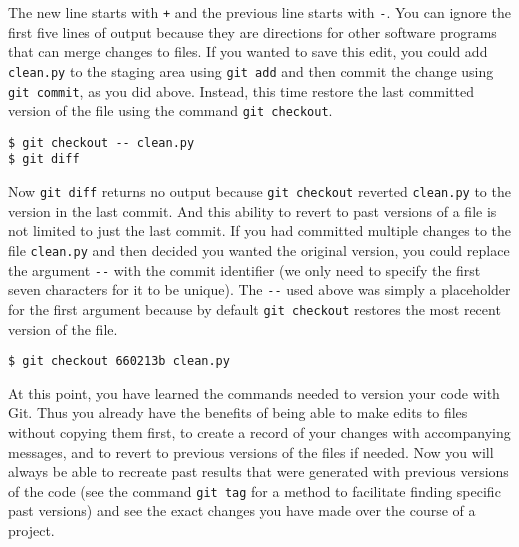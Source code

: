 The new line starts with \verb|+| and the previous line starts with \verb|-|.
You can ignore the first five lines of output because they are directions for other software programs that can merge changes to files.
If you wanted to save this edit, you could add \verb|clean.py| to the staging area using \verb|git add| and then commit the change using \verb|git commit|, as you did above.
Instead, this time restore the last committed version of the file using the command \verb|git checkout|.

\begin{verbatim}
$ git checkout -- clean.py
$ git diff
\end{verbatim}

Now \verb|git diff| returns no output because \verb|git checkout| reverted \verb|clean.py| to the version in the last commit.
And this ability to revert to past versions of a file is not limited to just the last commit.
If you had committed multiple changes to the file \verb|clean.py| and then decided you wanted the original version, you could replace the argument \verb|--| with the commit identifier (we only need to specify the first seven characters for it to be unique).
The \verb|--| used above was simply a placeholder for the first argument because by default \verb|git checkout| restores the most recent version of the file.

\begin{verbatim}
$ git checkout 660213b clean.py
\end{verbatim}


At this point, you have learned the commands needed to version your code with Git.
Thus you already have the benefits of being able to make edits to files without copying them first, to create a record of your changes with accompanying messages, and to revert to previous versions of the files if needed.
Now you will always be able to recreate past results that were generated with previous versions of the code (see the command \verb|git tag| for a method to facilitate finding specific past versions) and see the exact changes you have made over the course of a project.

  